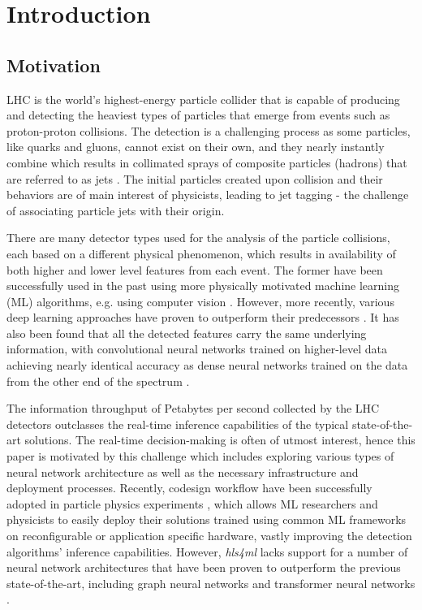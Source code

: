 \chapter{Introduction}\label{introduction}

\section{Motivation}\label{motivation}
LHC is the world's highest-energy particle collider that is capable of producing and detecting the heaviest types of particles that emerge from events such as proton-proton collisions. The detection is a challenging process as some particles, like quarks and gluons, cannot exist on their own, and they nearly instantly combine which results in collimated sprays of composite particles (hadrons) that are referred to as jets \cite{4-cernjets}. The initial particles created upon collision and their behaviors are of main interest of physicists, leading to jet tagging - the challenge of associating particle jets with their origin.

There are many detector types used for the analysis of the particle collisions, each based on a different physical phenomenon, which results in availability of both higher and lower level features from each event. The former have been successfully used in the past using more physically motivated machine learning (ML) algorithms, e.g. using computer vision \cite{5-cogan2015jet-images:}. However, more recently, various deep learning approaches have proven to outperform their predecessors \cite{6-de2016jet-images}. It has also been found that all the detected features carry the same underlying information, with convolutional neural networks trained on higher-level data achieving nearly identical accuracy as dense neural networks trained on the data from the other end of the spectrum \cite{7-moore2019reports}.

The information throughput of Petabytes per second collected by the LHC detectors outclasses the real-time inference capabilities of the typical state-of-the-art solutions. The real-time decision-making is often of utmost interest, hence this paper is motivated by this challenge which includes exploring various types of neural network architecture as well as the necessary infrastructure and deployment processes. Recently, \hlsml codesign workflow have been successfully adopted in particle physics experiments \cite{8-fahim2021hls4ml:}, which allows ML researchers and physicists to easily deploy their solutions trained using common ML frameworks on reconfigurable or application specific hardware, vastly improving the detection algorithms' inference capabilities. However, \textit{hls4ml} lacks support for a number of neural network architectures that have been proven to outperform the previous state-of-the-art, including graph neural networks \cite{9-newman2019jedi-net:, 11-elabd2021graph} and transformer neural networks \cite{3-yuan2021msc}.



